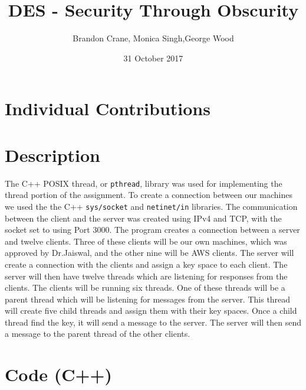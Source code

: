 \documentclass[11pt]{article}
\title{DES - Security Through Obscurity}
\author{Brandon Crane, Monica Singh,George Wood}
\date{31 October 2017}
\begin{document}
\maketitle

\thispagestyle{empty}

\section{Individual Contributions}



\section{Description}
The C++ POSIX thread, or \texttt{pthread}, library was used for implementing the thread portion of the assignment. To create a connection between our machines we used the the C++ \texttt{sys/socket} and  \texttt{netinet/in}  libraries. The communication between the client and the server was created using IPv4 and TCP, with the socket set to using Port 3000. The program creates a connection between a server and twelve clients. Three of these clients will be our own machines, which was approved by Dr.Jaiswal, and the other nine will be AWS clients. The server will create a connection with the clients and assign a key space to each client. The server will then have twelve threads which are listening for responses from the clients. The clients will be running six threads. One of these threads will be a parent thread which will be listening for messages from the server. This thread will create five child threads and assign them with their key spaces. Once a child thread find the key, it will send a message to the server. The server will then send a message to the parent thread of the other clients. 


\section{Code (C++)}
\begin{verbatim}

\end{verbatim}
\end{document}
